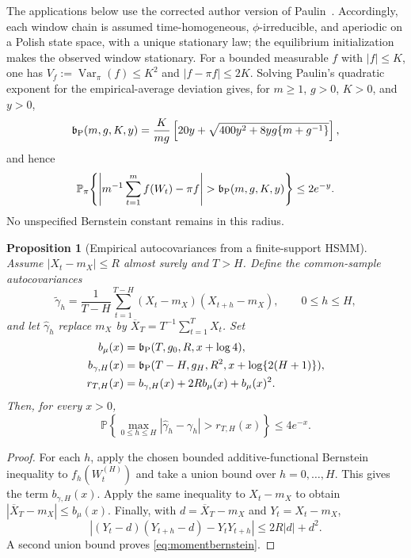 \documentclass[11pt]{article}
\newtheorem{proposition}[theorem]{Proposition}
\theoremstyle{definition}
\theoremstyle{remark}
\newcommand{\Pp}{\mathbb P}
\newcommand{\Var}{\operatorname{Var}}
\begin{document}
The applications below use the corrected author version of
Paulin~\cite[Assumption~3.1 and Theorem~3.11, equation~(3.25)]{Paulin2015}.
Accordingly, each window chain is assumed time-homogeneous,
$\phi$-irreducible, and aperiodic on a Polish state space, with a unique
stationary law; the equilibrium initialization makes the observed window
stationary.  For a bounded measurable $f$ with $|f|\le K$, one has
$V_f:=\Var_\pi(f)\le K^2$ and $|f-\pi f|\le2K$.  Solving Paulin's quadratic exponent for
the empirical-average deviation gives, for $m\ge1$, $g>0$, $K>0$, and $y>0$,
\begin{equation}
 {\mathfrak b}_{\rm P}(m,g,K,y)
 =\frac{K}{mg}\left[
 20y+\sqrt{400y^2+8yg\{m+g^{-1}\}}
 \right],
 \label{eq:bradius}
\end{equation}
and hence
\[
 \Pp_\pi\!\left\{
 \left|m^{-1}\sum_{t=1}^m f(W_t)-\pi f\right|
 >{\mathfrak b}_{\rm P}(m,g,K,y)
 \right\}\le2e^{-y}.
\]
No unspecified Bernstein constant remains in this radius.

\begin{proposition}[Empirical autocovariances from a finite-support HSMM]
\label{prop:autocov-concentration}
Assume $|X_t-m_X|\le R$ almost surely and $T>H$.  Define the common-sample
autocovariances
\[
 \widetilde\gamma_h
 =\frac1{T-H}\sum_{t=1}^{T-H}
 (X_t-m_X)(X_{t+h}-m_X),\qquad 0\le h\le H,
\]
and let $\widehat\gamma_h$ replace $m_X$ by
$\overline X_T=T^{-1}\sum_{t=1}^T X_t$.  Set
\begin{align}
 b_\mu(x)&={\mathfrak b}_{\rm P}(T,g_0,R,x+\log4),\\
 b_{\gamma,H}(x)
 &={\mathfrak b}_{\rm P}(T-H,g_H,R^2,x+\log\{2(H+1)\}),\\
 r_{T,H}(x)&=b_{\gamma,H}(x)+2R b_\mu(x)+b_\mu(x)^2.
 \label{eq:moment-radius}
\end{align}
Then, for every $x>0$,
\begin{equation}
 \Pp\!\left\{
 \max_{0\le h\le H}|\widehat\gamma_h-\gamma_h|
 >r_{T,H}(x)\right\}\le4e^{-x}.
 \label{eq:momentbernstein}
\end{equation}
\end{proposition}

\begin{proof}
For each $h$, apply the chosen bounded additive-functional Bernstein
inequality to $f_h(W_t^{(H)})$ and take a union bound over $h=0,\ldots,H$.
This gives the term $b_{\gamma,H}(x)$.  Apply the same inequality to
$X_t-m_X$ to obtain
$|\overline X_T-m_X|\le b_\mu(x)$.  Finally, with
$d=\overline X_T-m_X$ and $Y_t=X_t-m_X$,
\[
 |(Y_t-d)(Y_{t+h}-d)-Y_tY_{t+h}|
 \le 2R|d|+d^2.
\]
A second union bound proves \eqref{eq:momentbernstein}.
\end{proof}
\end{document}
